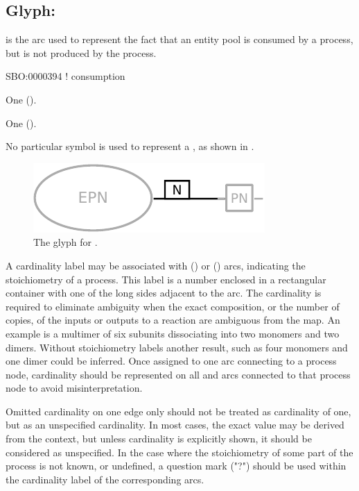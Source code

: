 \subsection{Glyph: }
\label{sec:consumption}

 is the arc used to represent the fact that an entity pool is consumed by a process, but is not produced by the process.

\begin{glyphDescription}

\glyphSboTerm
SBO:0000394 ! consumption

\glyphOrigin
One  ().

\glyphTarget
One  ().

\glyphSymbol
No particular symbol is used to represent a , as shown in .

\end{glyphDescription}

\begin{figure}[H]
  \centering
  \includegraphics{images/build/consumption.pdf}
  \caption{The \PD glyph for .}
  \label{fig:consumption}
\end{figure}

A cardinality label may be associated with  () or  () arcs, indicating the stoichiometry of a process.
This label is a number enclosed in a rectangular container with one of the long sides adjacent to the  arc.
The cardinality is required to eliminate ambiguity when the exact composition, or the number of copies, of the inputs or outputs to a reaction are ambiguous from the map.
An example is a multimer of six subunits dissociating into two monomers and two dimers.
Without stoichiometry labels another result, such as four monomers and one dimer could be inferred.
Once assigned to one arc connecting to a process node, cardinality should be represented on all  and  arcs connected to that process node to avoid misinterpretation.

Omitted cardinality on one edge only should not be treated as cardinality of one, but as an unspecified cardinality.
In most cases, the exact value may be derived from the context, but unless cardinality is explicitly shown, it should be considered as unspecified.
In the case where the stoichiometry of some part of the process is not known, or undefined, a question mark ("?") should be used within the cardinality label of the corresponding arcs.

